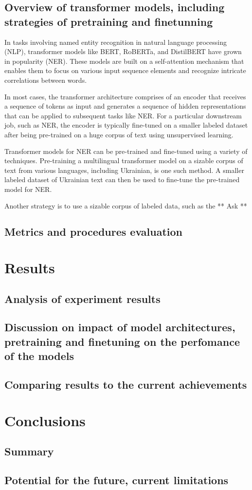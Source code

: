 \documentclass[a4paper,12pt]{report}
\begin{document}
\section{Overview of transformer models, including strategies of pretraining and finetunning}
In tasks involving named entity recognition in natural language processing (NLP), transformer models like BERT, RoBERTa, and DistilBERT have grown in popularity (NER). These models are built on a self-attention mechanism that enables them to focus on various input sequence elements and recognize intricate correlations between words.
\par
In most cases, the transformer architecture comprises of an encoder that receives a sequence of tokens as input and generates a sequence of hidden representations that can be applied to subsequent tasks like NER. For a particular downstream job, such as NER, the encoder is typically fine-tuned on a smaller labeled dataset after being pre-trained on a huge corpus of text using unsupervised learning.
\par
Transformer models for NER can be pre-trained and fine-tuned using a variety of techniques. Pre-training a multilingual transformer model on a sizable corpus of text from various languages, including Ukrainian, is one such method. A smaller labeled dataset of Ukrainian text can then be used to fine-tune the pre-trained model for NER.
\par
Another strategy is to use a sizable corpus of labeled data, such as the ** Ask **
\section{Metrics and procedures evaluation}


\chapter{Results}\label{cap:results}
\section{Analysis of experiment results}
\section{Discussion on impact of model architectures, pretraining and finetuning on the perfomance of the models}
\section{Comparing results to the current achievements}


\chapter{Conclusions}\label{cap:conclusions}
\section{Summary}
\section{Potential for the future, current limitations}



    
    
\end{document}
